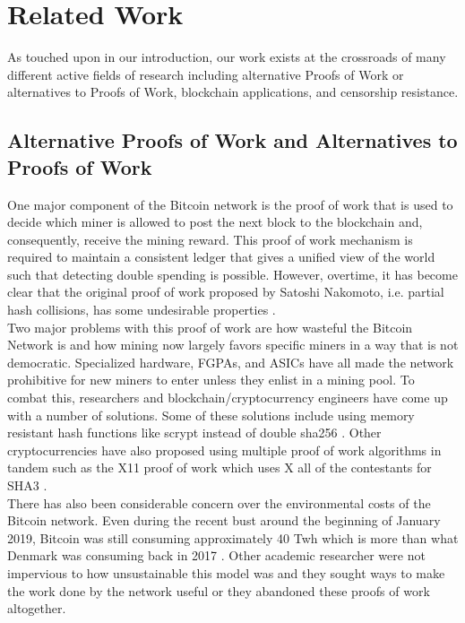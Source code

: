 \documentclass{article}
\begin{document}
\section{Related Work}
As touched upon in our introduction, our work exists at the crossroads of many different active fields of research including alternative Proofs of Work or alternatives to Proofs of Work, blockchain applications, and censorship resistance.

\subsection{Alternative Proofs of Work and Alternatives to Proofs of Work}
One major component of the Bitcoin network is the proof of work that is used to decide which miner is allowed to post the next block to the blockchain and, consequently, receive the mining reward. This proof of work mechanism is required to maintain a consistent ledger that gives a unified view of the world such that detecting double spending is possible. However, overtime, it has become clear that the original proof of work proposed by Satoshi Nakomoto, i.e. partial hash collisions, has some undesirable properties \cite{btc}.\\
Two major problems with this proof of work are how wasteful the Bitcoin Network is and how mining now largely favors specific miners in a way that is not democratic. Specialized hardware, FGPAs, and ASICs have all made the network prohibitive for new miners to enter unless they enlist in a mining pool. To combat this, researchers and blockchain/cryptocurrency engineers have come up with a number of solutions. Some of these solutions include using memory resistant hash functions like scrypt instead of double sha256 \cite{litecoin}. Other cryptocurrencies have also proposed using multiple proof of work algorithms in tandem such as the X11 proof of work which uses X all of the contestants for SHA3 \cite{dash-coin}.\\
There has also been considerable concern over the environmental costs of the Bitcoin network. Even during the recent bust around the beginning of January 2019, Bitcoin was still consuming approximately 40 Twh \cite{btc-consumption} which is more than what Denmark was consuming back in 2017 \cite{somuchenergy}. Other academic researcher were not impervious to how unsustainable this model was and they sought ways to make the work done by the network useful or they abandoned these proofs of work altogether.\\
\end{document}
